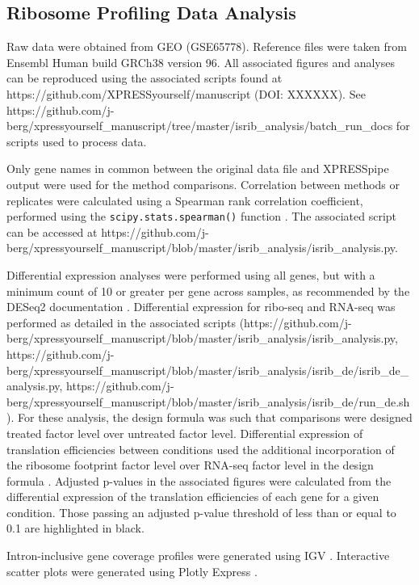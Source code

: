 \documentclass[10pt, oneside]{article}
\begin{document}
\subsection{Ribosome Profiling Data Analysis}
Raw data were obtained from GEO (GSE65778). Reference files were taken from Ensembl Human build GRCh38 version 96. All associated figures and analyses can be reproduced using the associated scripts found at https://github.com/XPRESSyourself/manuscript (DOI: XXXXXX). See https://github.com/j-berg/xpressyourself\_manuscript/tree/master/isrib\_analysis/batch\_run\_docs for scripts used to process data. \par

Only gene names in common between the original data file and XPRESSpipe output were used for the method comparisons. Correlation between methods or replicates were calculated using a Spearman rank correlation coefficient, performed using the \texttt{scipy.stats.spearman()} function \cite{spearman_rnaseq}. The associated script can be accessed at https://github.com/j-berg/xpressyourself\_manuscript/blob/master/isrib\_analysis/isrib\_analysis.py. \par

Differential expression analyses were performed using all genes, but with a minimum count of 10 or greater per gene across samples, as recommended by the DESeq2 documentation \cite{deseq2}. Differential expression for ribo-seq and RNA-seq was performed as detailed in the associated scripts (https://github.com/j-berg/xpressyourself\_manuscript/blob/master/isrib\_analysis/isrib\_analysis.py, https://github.com/j-berg/xpressyourself\_manuscript/blob/master/isrib\_analysis/isrib\_de/isrib\_de\_analysis.py, https://github.com/j-berg/xpressyourself\_manuscript/blob/master/isrib\_analysis/isrib\_de/run\_de.sh). For these analysis, the design formula was such that comparisons were designed treated factor level over untreated factor level. Differential expression of translation efficiencies between conditions used the additional incorporation of the ribosome footprint factor level over RNA-seq factor level in the design formula \cite{deseq2,isrib_riboseq,ingolia_meth}. Adjusted p-values in the associated figures were calculated from the differential expression of the translation efficiencies of each gene for a given condition. Those passing an adjusted p-value threshold of less than or equal to 0.1 are highlighted in black. \par

Intron-inclusive gene coverage profiles were generated using IGV \cite{igv}. Interactive scatter plots were generated using Plotly Express \cite{plotly}. \par
\end{document}
